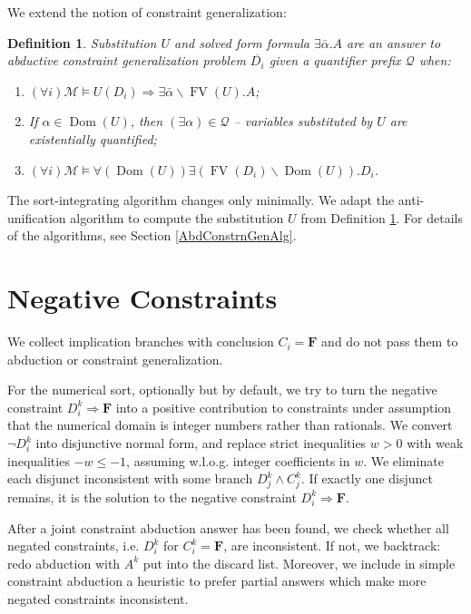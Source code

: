 \documentclass{article}
\newcommand{\tmem}[1]{{\em #1\/}}
\newcommand{\tmmathbf}[1]{\ensuremath{\boldsymbol{#1}}}
\newcommand{\tmop}[1]{\ensuremath{\operatorname{#1}}}
\newtheorem{definition}{Definition}
{\theorembodyfont{\rmfamily}\newtheorem{example}{Example}}
\begin{document}
We extend the notion of constraint generalization:

\begin{definition}
  \label{CorAbdLUB}Substitution $U$ and solved form formula $\exists
  \bar{\alpha} .A$ are an answer to {\tmem{abductive constraint
  generalization}} problem $\overline{D_i}$ given a quantifier prefix
  $\mathcal{Q}$ when:
  \begin{enumerate}
    \item $(\forall i) \mathcal{M} \vDash U (D_i) \Rightarrow \exists
    \bar{\alpha} \backslash \tmop{FV} (U) .A$;
    
    \item If $\alpha \in \tmop{Dom} (U)$, then $(\exists \alpha) \in
    \mathcal{Q}$ -- variables substituted by $U$ are existentially quantified;
    
    \item $(\forall i) \mathcal{M} \vDash \forall (\tmop{Dom} (U)) \exists
    (\tmop{FV} (D_i) \backslash \tmop{Dom} (U)) .D_i$.
  \end{enumerate}
\end{definition}

The sort-integrating algorithm changes only minimally. We adapt the
anti-unification algorithm to compute the substitution $U$ from Definition
\ref{CorAbdLUB}. For details of the algorithms, see Section
\ref{AbdConstrnGenAlg}.

\section{Negative Constraints}\label{NegElimMain}

We collect implication branches with conclusion $C_i =\tmmathbf{F}$ and do not
pass them to abduction or constraint generalization.

For the numerical sort, optionally but by default, we try to turn the negative
constraint $D_i^k \Rightarrow \tmmathbf{F}$ into a positive contribution to
constraints under assumption that the numerical domain is integer numbers
rather than rationals. We convert $\neg D_i^k$ into disjunctive normal form,
and replace strict inequalities $w > 0$ with weak inequalities $- w \leq - 1$,
assuming w.l.o.g. integer coefficients in $w$. We eliminate each disjunct
inconsistent with some branch $D_j^k \wedge C_j^k$. If exactly one disjunct
remains, it is the solution to the negative constraint $D_i^k \Rightarrow
\tmmathbf{F}$.

After a joint constraint abduction answer has been found, we check whether all
negated constraints, i.e. $D_i^k$ for $C_i^k =\tmmathbf{F}$, are inconsistent.
If not, we backtrack: redo abduction with $A^k$ put into the discard list.
Moreover, we include in simple constraint abduction a heuristic to prefer
partial answers which make more negated constraints inconsistent.
\end{document}
